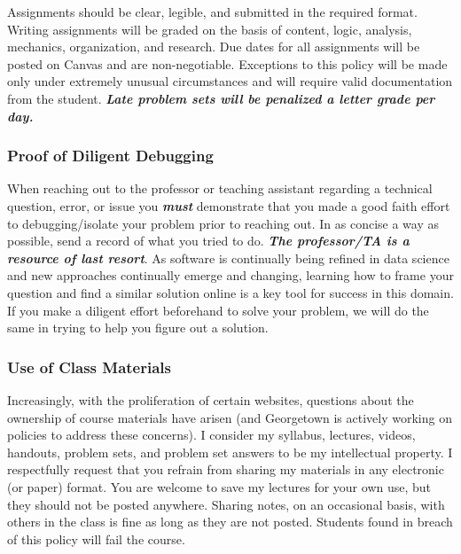 \documentclass[
  12pt,
]{article}
\begin{document}
Assignments should be clear, legible, and submitted in the required
format. Writing assignments will be graded on the basis of content,
logic, analysis, mechanics, organization, and research. Due dates for
all assignments will be posted on Canvas and are non-negotiable.
Exceptions to this policy will be made only under extremely unusual
circumstances and will require valid documentation from the student.
\textbf{\emph{Late problem sets will be penalized a letter grade per
day.}}

\hypertarget{proof-of-diligent-debugging}{%
\subsubsection{Proof of Diligent
Debugging}\label{proof-of-diligent-debugging}}

When reaching out to the professor or teaching assistant regarding a
technical question, error, or issue you \textbf{\emph{must}} demonstrate
that you made a good faith effort to debugging/isolate your problem
prior to reaching out. In as concise a way as possible, send a record of
what you tried to do. \textbf{\emph{The professor/TA is a resource of
last resort}}. As software is continually being refined in data science
and new approaches continually emerge and changing, learning how to
frame your question and find a similar solution online is a key tool for
success in this domain. If you make a diligent effort beforehand to
solve your problem, we will do the same in trying to help you figure out
a solution.

\hypertarget{use-of-class-materials}{%
\subsubsection{Use of Class Materials}\label{use-of-class-materials}}

Increasingly, with the proliferation of certain websites, questions
about the ownership of course materials have arisen (and Georgetown is
actively working on policies to address these concerns). I consider my
syllabus, lectures, videos, handouts, problem sets, and problem set
answers to be my intellectual property. I respectfully request that you
refrain from sharing my materials in any electronic (or paper) format.
You are welcome to save my lectures for your own use, but they should
not be posted anywhere. Sharing notes, on an occasional basis, with
others in the class is fine as long as they are not posted. Students
found in breach of this policy will fail the course.
\end{document}
